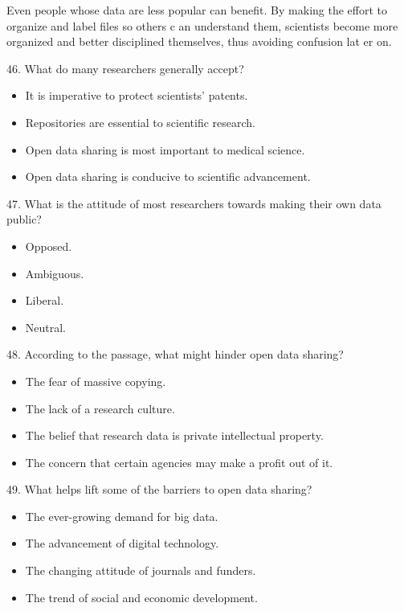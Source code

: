 \documentclass[UTF8,11pt]{ctexart}
\begin{document}
Even people whose data are less popular can benefit. By making the effort to organize and label files so others c an understand them, scientists become more organized and better disciplined themselves, thus avoiding confusion lat er on.


46. What do many researchers generally accept?


\begin{itemize}[leftmargin=2em,itemsep=.2em,topsep=.4em]\item[A.] It is imperative to protect scientists' patents.
\item[B.] Repositories are essential to scientific research.
\item[C.] Open data sharing is most important to medical science.
\item[D.] Open data sharing is conducive to scientific advancement.
\end{itemize}

47. What is the attitude of most researchers towards making their own data public?


\begin{itemize}[leftmargin=2em,itemsep=.2em,topsep=.4em]\item[A.] Opposed.
\item[B.] Ambiguous.
\item[C.] Liberal.
\item[D.] Neutral.
\end{itemize}

48. According to the passage, what might hinder open data sharing?


\begin{itemize}[leftmargin=2em,itemsep=.2em,topsep=.4em]\item[A.] The fear of massive copying.
\item[B.] The lack of a research culture.
\item[C.] The belief that research data is private intellectual property.
\item[D.] The concern that certain agencies may make a profit out of it.
\end{itemize}

49. What helps lift some of the barriers to open data sharing?


\begin{itemize}[leftmargin=2em,itemsep=.2em,topsep=.4em]\item[A.] The ever-growing demand for big data.
\item[B.] The advancement of digital technology.
\item[C.] The changing attitude of journals and funders.
\item[D.] The trend of social and economic development.
\end{itemize}
\end{document}
